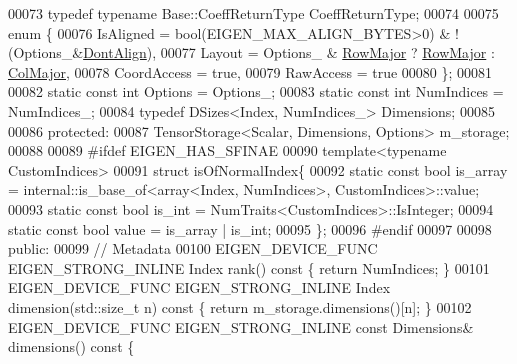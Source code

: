 \begin{DoxyCode}
00073     \textcolor{keyword}{typedef} \textcolor{keyword}{typename} Base::CoeffReturnType CoeffReturnType;
00074 
00075     \textcolor{keyword}{enum} \{
00076       IsAligned = bool(EIGEN\_MAX\_ALIGN\_BYTES>0) & !(Options\_&\hyperlink{group__enums_ggaacded1a18ae58b0f554751f6cdf9eb13a40a452614141522dd313363dbbd65726}{DontAlign}),
00077       Layout = Options\_ & \hyperlink{group__enums_ggaacded1a18ae58b0f554751f6cdf9eb13acfcde9cd8677c5f7caf6bd603666aae3}{RowMajor} ? \hyperlink{group__enums_ggaacded1a18ae58b0f554751f6cdf9eb13acfcde9cd8677c5f7caf6bd603666aae3}{RowMajor} : \hyperlink{group__enums_ggaacded1a18ae58b0f554751f6cdf9eb13a0cbd4bdd0abcfc0224c5fcb5e4f6669a}{ColMajor},
00078       CoordAccess = \textcolor{keyword}{true},
00079       RawAccess = \textcolor{keyword}{true}
00080     \};
00081 
00082     \textcolor{keyword}{static} \textcolor{keyword}{const} \textcolor{keywordtype}{int} Options = Options\_;
00083     \textcolor{keyword}{static} \textcolor{keyword}{const} \textcolor{keywordtype}{int} NumIndices = NumIndices\_;
00084     \textcolor{keyword}{typedef} DSizes<Index, NumIndices\_> Dimensions;
00085 
00086   \textcolor{keyword}{protected}:
00087     TensorStorage<Scalar, Dimensions, Options> m\_storage;
00088 
00089 \textcolor{preprocessor}{#ifdef EIGEN\_HAS\_SFINAE}
00090     \textcolor{keyword}{template}<\textcolor{keyword}{typename} CustomIndices>
00091     \textcolor{keyword}{struct }isOfNormalIndex\{
00092       \textcolor{keyword}{static} \textcolor{keyword}{const} \textcolor{keywordtype}{bool} is\_array = internal::is\_base\_of<array<Index, NumIndices>, CustomIndices>::value;
00093       \textcolor{keyword}{static} \textcolor{keyword}{const} \textcolor{keywordtype}{bool} is\_int = NumTraits<CustomIndices>::IsInteger;
00094       \textcolor{keyword}{static} \textcolor{keyword}{const} \textcolor{keywordtype}{bool} value = is\_array | is\_int;
00095     \};
00096 \textcolor{preprocessor}{#endif}
00097 
00098   \textcolor{keyword}{public}:
00099     \textcolor{comment}{// Metadata}
00100     EIGEN\_DEVICE\_FUNC EIGEN\_STRONG\_INLINE Index                         rank()\textcolor{keyword}{                   const }\{ \textcolor{keywordflow}{
      return} NumIndices; \}
00101     EIGEN\_DEVICE\_FUNC EIGEN\_STRONG\_INLINE Index                         dimension(std::size\_t n)\textcolor{keyword}{ const }\{ \textcolor{keywordflow}{
      return} m\_storage.dimensions()[n]; \}
00102     EIGEN\_DEVICE\_FUNC EIGEN\_STRONG\_INLINE \textcolor{keyword}{const} Dimensions&             dimensions()\textcolor{keyword}{             const }\{ \textcolor{keywordflow}{
}
\end{DoxyCode}
